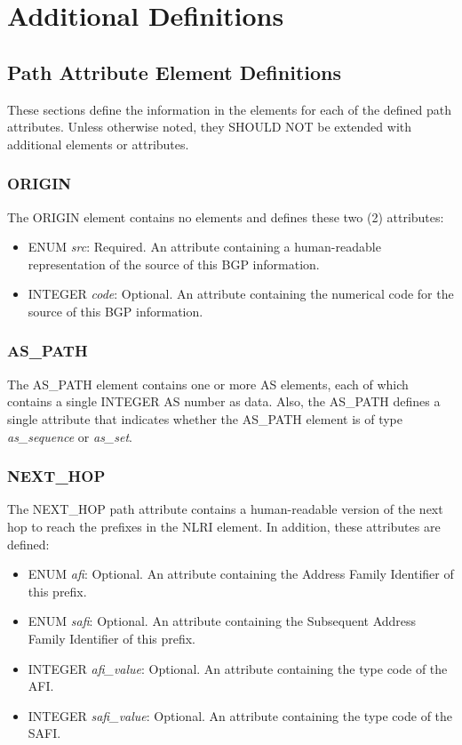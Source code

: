 \documentclass{article}
\begin{document}
\section{Additional Definitions}

\subsection{Path Attribute Element Definitions}
These sections define the information in the elements for each of the defined path attributes.  Unless otherwise noted, they SHOULD NOT be extended with additional elements or attributes.
\label{ATTR}
\subsubsection{ORIGIN}
The ORIGIN element contains no elements and defines these two (2) attributes:

\begin{itemize}
\item{ENUM \emph{src}: Required. An attribute containing a human-readable representation of the source of this BGP information.}
\item{INTEGER \emph{code}: Optional. An attribute containing the numerical code for the source of this BGP information.}
\end{itemize}

\subsubsection{AS_PATH}
The AS_PATH element contains one or more AS elements, each of which contains a single INTEGER AS number as data.  Also, the AS_PATH defines a single attribute that indicates whether the AS_PATH element is of type \emph{as_sequence} or \emph{as_set}.

\subsubsection{NEXT_HOP}
The NEXT_HOP path attribute contains a human-readable version of the next hop to reach the prefixes in the NLRI element.  In addition, these attributes are defined:

\begin{itemize}
\item{ENUM \emph{afi}: Optional. An attribute containing the Address Family Identifier of this prefix.}
\item{ENUM \emph{safi}: Optional. An attribute containing the Subsequent Address Family Identifier of this prefix.}
\item{INTEGER \emph{afi_value}: Optional. An attribute containing the type code of the AFI.}
\item{INTEGER \emph{safi_value}: Optional. An attribute containing the type code of the SAFI.}
\end{itemize}
\end{document}
